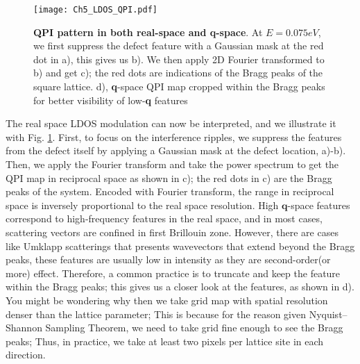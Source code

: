 \begin{figure}
	\centering
	\texttt{[image: Ch5\_LDOS\_QPI.pdf]} 
	\caption[\textbf{QPI pattern in both real-space and \textbf{q}-space}]{\textbf{QPI pattern in both real-space and \textbf{q}-space}. At $E=0.075eV$, we first suppress the defect feature with a Gaussian mask at the red dot in a), this gives us b). We then apply 2D Fourier transformed to b) and get c); the red dots are indications of the Bragg peaks of the square lattice. d), \textbf{q}-space QPI map cropped within the Bragg peaks for better visibility of low-\textbf{q} features}
	\label{fig:ch5_ldos}
\end{figure}

The real space \ac{LDOS} modulation can now be interpreted, and we illustrate it with Fig. \ref{fig:ch5_ldos}. First, to focus on the interference ripples, we suppress the features from the defect itself by applying a Gaussian mask at the defect location, a)-b). Then, we apply the Fourier transform and take the power spectrum to get the \ac{QPI} map in reciprocal space as shown in c); the red dots in c) are the Bragg peaks of the system. Encoded with Fourier transform, the range in reciprocal space is inversely proportional to the real space resolution. High $\textbf{q}$-space features correspond to high-frequency features in the real space, and in most cases, scattering vectors are confined in first Brillouin zone. However, there are cases like Umklapp scatterings that presents wavevectors that extend beyond the Bragg peaks, these features are usually low in intensity as they are second-order(or more) effect. Therefore, a common practice is to truncate and keep the feature within the Bragg peaks; this gives us a closer look at the features, as shown in d). You might be wondering why then we take grid map with spatial resolution denser than the lattice parameter; This is because for the reason given Nyquist–Shannon Sampling Theorem, we need to take grid fine enough to see the Bragg peaks; Thus, in practice, we take at least two pixels per lattice site in each direction.  

